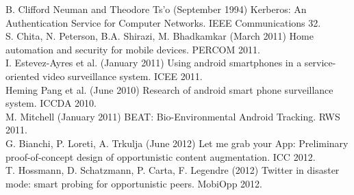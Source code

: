 \documentclass[conference, 11pt]{IEEEtran}
\begin{document}
\begin{thebibliography}{1}

\bibitem{}
B. Clifford Neuman and Theodore Ts'o (September 1994) Kerberos: An Authentication Service for Computer Networks. IEEE Communications 32. \\
\bibitem{}
S. Chita, N. Peterson, B.A. Shirazi, M. Bhadkamkar (March 2011) Home automation and security for mobile devices. PERCOM 2011. \\
\bibitem{}
I. Estevez-Ayres et al. (January 2011) Using android smartphones in a service-oriented video surveillance system. ICEE 2011. \\
\bibitem{}
Heming Pang et al. (June 2010) Research of android smart phone surveillance system. ICCDA 2010. \\
\bibitem{}
M. Mitchell (January 2011) BEAT: Bio-Environmental Android Tracking. RWS 2011. \\
\bibitem{}
G. Bianchi, P. Loreti, A. Trkulja (June 2012) Let me grab your App: Preliminary proof-of-concept design of opportunistic content augmentation. ICC 2012. \\
\bibitem{}
T. Hossmann, D. Schatzmann, P. Carta, F. Legendre (2012) Twitter in disaster mode: smart probing for opportunistic peers. MobiOpp 2012.\\


\end{thebibliography}

\end{document}
